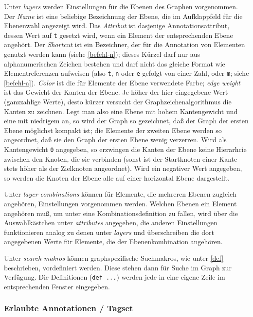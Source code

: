 \documentclass[12pt]{scrartcl}
\begin{document}
Unter \textit{layers} werden Einstellungen für die Ebenen des Graphen vorgenommen. Der \textit{Name} ist eine beliebige Bezeichnung der Ebene, die im Aufklappfeld für die Ebenenwahl angezeigt wird. Das \textit{Attribut} ist dasjenige Annotationsattribut, dessen Wert auf \texttt{t} gesetzt wird, wenn ein Element der entsprechenden Ebene angehört. Der \textit{Shortcut} ist ein Bezeichner, der für die Annotation von Elementen genutzt werden kann (siehe \ref{befehl-n}); dieses Kürzel darf nur aus alphanumerischen Zeichen bestehen und darf nicht das gleiche Format wie Elementreferenzen aufweisen (also \texttt{t}, \texttt{n} oder \texttt{e} gefolgt von einer Zahl, oder  \texttt{m}; siehe \ref{befehl-a}). \textit{Color} ist die für Elemente der Ebene verwendete Farbe; \textit{edge weight} ist das Gewicht der Kanten der Ebene. Je höher der hier eingegebene Wert (ganzzahlige Werte), desto kürzer versucht der Graphzeichenalgorithmus die Kanten zu zeichnen. Legt man also eine Ebene mit hohem Kantengewicht und eine mit niedrigem an, so wird der Graph so gezeichnet, daß der Graph der ersten Ebene möglichst kompakt ist; die Elemente der zweiten Ebene werden so angeordnet, daß sie den Graph der ersten Ebene wenig verzerren. Wird als Kantengewicht \texttt{0} angegeben, so erzwingen die Kanten der Ebene keine Hierarhcie zwischen den Knoten, die sie verbinden (sonst ist der Startknoten einer Kante stets höher als der Zielknoten angeordnet). Wird ein negativer Wert angegeben, so werden die Knoten der Ebene alle auf einer horizontal Ebene dargestellt.

Unter \textit{layer combinations} können für Elemente, die mehreren Ebenen zugleich angehören, Einstellungen vorgenommen werden. Welchen Ebenen ein Element angehören muß, um unter eine Kombinationsdefinition zu fallen, wird über die Auswahlkästchen unter \textit{attributes} angegeben, die anderen Einstellungen funktionieren analog zu denen unter \textit{layers} und überschreiben die dort angegebenen Werte für Elemente, die der Ebenenkombination angehören.

Unter \textit{search makros} können graphspezifische Suchmakros, wie unter \ref{def} beschrieben, vordefiniert werden. Diese stehen dann für Suche im Graph zur Verfügung. Die Definitionen (\texttt{def ...}) werden jede in eine eigene Zeile im entsprechenden Fenster eingegeben.

\subsubsection{Erlaubte Annotationen / Tagset}\label{erlaubteannotationen}
\end{document}
